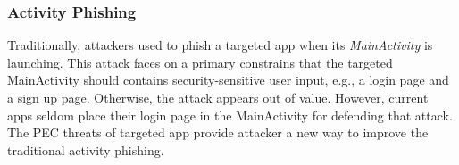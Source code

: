 





%
%

\subsubsection{Activity Phishing}
Traditionally, attackers used to phish a  targeted app when its \textit{MainActivity} is launching. This attack faces on a primary constrains that the targeted  MainActivity should contains security-sensitive user input, e.g., a login page and a sign up page. Otherwise, the attack appears out of value. However, current apps seldom place their login page in the MainActivity for defending that attack. The PEC threats of targeted app provide attacker a new way to improve the traditional activity phishing.  

